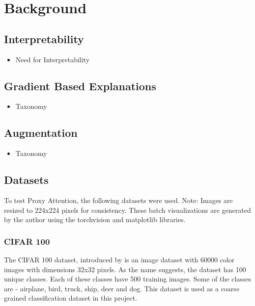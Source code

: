 \chapter{Background}
\section{Interpretability}
\begin{itemize}
	\item Need for Interpretability
\end{itemize}
\section{Gradient Based Explanations}
\begin{itemize}
	\item Taxonomy
\end{itemize}
\section{Augmentation}
\begin{itemize}
	\item Taxonomy
\end{itemize}
\section{Datasets}
To test Proxy Attention, the following datasets were used.
Note: Images are resized to 224x224 pixels for consistency. These batch visualizations are generated by the author using the torchvision and matplotlib libraries.

\subsection*{CIFAR 100}
The CIFAR 100 dataset, introduced by \cite{krizhevskyLearningMultipleLayers} is an image dataset with 60000 color images with dimensions 32x32 pixels. As the name suggests, the dataset has 100 unique classes. Each of these classes have 500 training images. Some of the classes are - airplane, bird, truck, ship, deer and dog. This dataset is used as a coarse grained classification dataset in this project.



